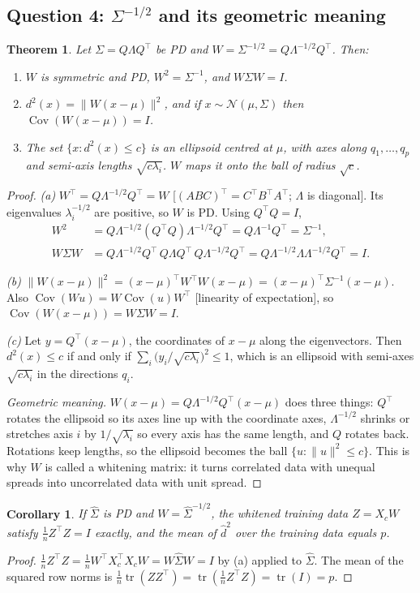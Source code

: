 \documentclass[11pt]{article}
\newcommand{\tr}{\operatorname{tr}}
\newcommand{\Cov}{\operatorname{Cov}}
\newcommand{\T}{^{\top}}
\newcommand{\hSigma}{\hat{\Sigma}}
\newcommand{\norm}[1]{\lVert #1\rVert}
\theoremstyle{plain}
\newtheorem{theorem}{Theorem}
\newtheorem{corollary}{Corollary}
\theoremstyle{definition}
\theoremstyle{remark}
\begin{document}
\subsection{Question 4: $\Sigma^{-1/2}$ and its geometric meaning}
\begin{theorem}\label{thm:whiten}
Let $\Sigma=Q\Lambda Q\T$ be PD and $W=\Sigma^{-1/2}=Q\Lambda^{-1/2}Q\T$. Then:
\begin{enumerate}[label=(\alph*),nosep]
\item $W$ is symmetric and PD, $W^2=\Sigma^{-1}$, and $W\Sigma W=I$.
\item $d^2(x)=\norm{W(x-\mu)}^2$, and if $x\sim\mathcal N(\mu,\Sigma)$ then
 $\Cov(W(x-\mu))=I$.
\item The set $\{x:d^2(x)\le c\}$ is an ellipsoid centred at $\mu$, with axes along
 $q_1,\dots,q_p$ and semi-axis lengths $\sqrt{c\lambda_i}$. $W$ maps it onto the ball
 of radius $\sqrt c$.
\end{enumerate}
\end{theorem}
\begin{proof}
\textit{(a)} $W\T=Q\Lambda^{-1/2}Q\T=W$ [$(ABC)\T=C\T B\T A\T$; $\Lambda$ is diagonal].
Its eigenvalues $\lambda_i^{-1/2}$ are positive, so $W$ is PD. Using $Q\T Q=I$,
\begin{align*}
W^2&=Q\Lambda^{-1/2}(Q\T Q)\Lambda^{-1/2}Q\T=Q\Lambda^{-1}Q\T=\Sigma^{-1},\\
W\Sigma W&=Q\Lambda^{-1/2}Q\T\,Q\Lambda Q\T\,Q\Lambda^{-1/2}Q\T=Q\Lambda^{-1/2}\Lambda\Lambda^{-1/2}Q\T=I.
\end{align*}

\textit{(b)} $\norm{W(x-\mu)}^2=(x-\mu)\T W\T W(x-\mu)=(x-\mu)\T\Sigma^{-1}(x-\mu)$.
Also $\Cov(Wu)=W\Cov(u)W\T$ [linearity of expectation], so
$\Cov(W(x-\mu))=W\Sigma W=I$.

\textit{(c)} Let $y=Q\T(x-\mu)$, the coordinates of $x-\mu$ along the eigenvectors.
Then $d^2(x)\le c$ if and only if $\sum_i\big(y_i/\sqrt{c\lambda_i}\big)^2\le1$, which is
an ellipsoid with semi-axes $\sqrt{c\lambda_i}$ in the directions $q_i$.

\textit{Geometric meaning.} $W(x-\mu)=Q\Lambda^{-1/2}Q\T(x-\mu)$ does three things:
$Q\T$ rotates the ellipsoid so its axes line up with the coordinate axes,
$\Lambda^{-1/2}$ shrinks or stretches axis $i$ by $1/\sqrt{\lambda_i}$ so every axis
has the same length, and $Q$ rotates back. Rotations keep lengths, so the ellipsoid
becomes the ball $\{u:\norm u^2\le c\}$. This is why $W$ is called a whitening matrix:
it turns correlated data with unequal spreads into uncorrelated data with unit spread.
\end{proof}
\begin{corollary}\label{cor:whitesample}
If $\hSigma$ is PD and $W=\hSigma^{-1/2}$, the whitened training data $Z=X_cW$ satisfy
$\frac1nZ\T Z=I$ exactly, and the mean of $\hat d^2$ over the training data equals $p$.
\end{corollary}
\begin{proof}
$\frac1nZ\T Z=\frac1nW\T X_c\T X_cW=W\hSigma W=I$ by (a) applied to $\hSigma$. The mean
of the squared row norms is $\frac1n\tr(ZZ\T)=\tr(\frac1nZ\T Z)=\tr(I)=p$.
\end{proof}
\end{document}

